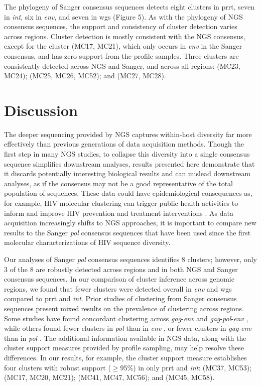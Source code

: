 \documentclass[letterpaper]{article}
\begin{document}
The phylogeny of Sanger consensus sequences detects eight clusters in prrt, seven in \emph{int}, six in \emph{env}, and seven in wgs (Figure 5). As with the phylogeny of NGS consensus sequences, the support and consistency of cluster detection varies across regions. Cluster detection is mostly consistent with the NGS consensus, except for the cluster (MC17, MC21), which only occurs in \emph{env} in the Sanger consensus, and has zero support from the profile samples. Three clusters are consistently detected across NGS and Sanger, and across all regions: (MC23, MC24); (MC25, MC26, MC52); and (MC27, MC28).

\section*{Discussion}

The deeper sequencing provided by NGS captures within-host diversity far more effectively than previous generations of data acquisition methods. Though the first step in many NGS studies, to collapse this diversity into a single consensus sequence simplifies downstream analyses, results presented here demonstrate that it discards potentially interesting biological results and can mislead downstream analyses, as if the consensus may not be a good representative of the total population of sequences. These data could have epidemiological consequences as, for example, HIV molecular clustering can trigger public health activities to inform and improve HIV prevention and treatment interventions \parencite{peters}. As data acquisition increasingly shifts to NGS approaches, it is important to compare new results to the Sanger \emph{pol} consensus sequences that have been used since the first molecular characterizations of HIV sequence diversity.

Our analyses of Sanger \emph{pol} consensus sequences identifies 8 clusters; however, only 3 of the 8 are robustly detected across regions and in both NGS and Sanger consensus sequences.  In our comparison of cluster inference across genomic regions, we found that fewer clusters were detected overall in \emph{env} and wgs compared to prrt and \emph{int}. Prior studies of clustering from Sanger consensus sequences present mixed results on the prevalence of clustering across regions. Some studies have found concordant clustering across \emph{gag}-\emph{env} \parencite{han} and \emph{gag}-\emph{pol}-\emph{env} \parencite{english,kaye}, while others found fewer clusters in \emph{pol} than in \emph{env} \parencite{kapaata}, or fewer clusters in \emph{gag}-\emph{env} than in \emph{pol} \parencite{ndiaye}. The additional information available in NGS data, along with the cluster support measures provided by profile sampling, may help resolve these differences. In our results, for example, the cluster support measure establishes four clusters with robust support ($\geq$95\%) in only prrt and \emph{int}: (MC37, MC53); (MC17, MC20, MC21); (MC41, MC47, MC56); and (MC45, MC58).
\end{document}
